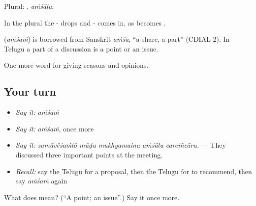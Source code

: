 Plural: , \emph{aṁśālu}.

In the plural the - drops and - comes in, as  becomes .

\begin{cousinweb}
\textbf{} (\emph{aṁśaṁ}) is borrowed from Sanskrit \emph{aṁśa}, \textquotedblleft{}a share, a part\textquotedblright{} (CDIAL 2). In Telugu a part of a discussion is a point or an issue.
\end{cousinweb}

\begin{grammarlens}[title={What you've built}]
One more word for giving reasons and opinions.
\end{grammarlens}

\subsection*{Your turn}
\begin{itemize}
\raggedright
  \item \emph{Say it:} \emph{aṁśaṁ}
  \item \emph{Say it:} \emph{aṁśaṁ}, once more
  \item \emph{Say it:} \emph{samāvēśaṁlō mūḍu mukhyamaina aṁśālu carciñcāru.} — They discussed three important points at the meeting.
  \item \emph{Recall:} say the Telugu for a proposal, then the Telugu for to recommend, then say \emph{aṁśaṁ} again
\end{itemize}

\begin{tcolorbox}[breakable,colback=teal!4,colframe=teal!35!black,title={Before you move on}]
What does  mean? (\textquotedblleft{}A point; an issue\textquotedblright{}.) Say it once more.
\end{tcolorbox}
